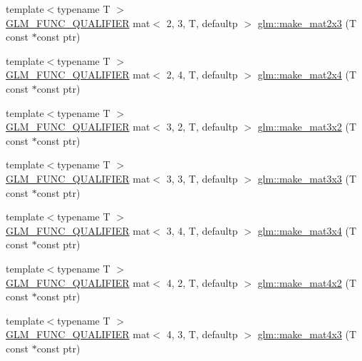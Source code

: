 \begin{DoxyCompactItemize}
\item 
{\footnotesize template$<$typename T $>$ }\\\hyperlink{setup_8hpp_a33fdea6f91c5f834105f7415e2a64407}{G\+L\+M\+\_\+\+F\+U\+N\+C\+\_\+\+Q\+U\+A\+L\+I\+F\+I\+ER} mat$<$ 2, 3, T, defaultp $>$ \hyperlink{group__gtc__type__ptr_ga21982104164789cf8985483aaefc25e8}{glm\+::make\+\_\+mat2x3} (T const $\ast$const ptr)
\item 
{\footnotesize template$<$typename T $>$ }\\\hyperlink{setup_8hpp_a33fdea6f91c5f834105f7415e2a64407}{G\+L\+M\+\_\+\+F\+U\+N\+C\+\_\+\+Q\+U\+A\+L\+I\+F\+I\+ER} mat$<$ 2, 4, T, defaultp $>$ \hyperlink{group__gtc__type__ptr_ga078b862c90b0e9a79ed43a58997d8388}{glm\+::make\+\_\+mat2x4} (T const $\ast$const ptr)
\item 
{\footnotesize template$<$typename T $>$ }\\\hyperlink{setup_8hpp_a33fdea6f91c5f834105f7415e2a64407}{G\+L\+M\+\_\+\+F\+U\+N\+C\+\_\+\+Q\+U\+A\+L\+I\+F\+I\+ER} mat$<$ 3, 2, T, defaultp $>$ \hyperlink{group__gtc__type__ptr_ga27a24e121dc39e6857620e0f85b6e1a8}{glm\+::make\+\_\+mat3x2} (T const $\ast$const ptr)
\item 
{\footnotesize template$<$typename T $>$ }\\\hyperlink{setup_8hpp_a33fdea6f91c5f834105f7415e2a64407}{G\+L\+M\+\_\+\+F\+U\+N\+C\+\_\+\+Q\+U\+A\+L\+I\+F\+I\+ER} mat$<$ 3, 3, T, defaultp $>$ \hyperlink{group__gtc__type__ptr_gaf2e8337b15c3362aaeb6e5849e1c0536}{glm\+::make\+\_\+mat3x3} (T const $\ast$const ptr)
\item 
{\footnotesize template$<$typename T $>$ }\\\hyperlink{setup_8hpp_a33fdea6f91c5f834105f7415e2a64407}{G\+L\+M\+\_\+\+F\+U\+N\+C\+\_\+\+Q\+U\+A\+L\+I\+F\+I\+ER} mat$<$ 3, 4, T, defaultp $>$ \hyperlink{group__gtc__type__ptr_ga05dd66232aedb993e3b8e7b35eaf932b}{glm\+::make\+\_\+mat3x4} (T const $\ast$const ptr)
\item 
{\footnotesize template$<$typename T $>$ }\\\hyperlink{setup_8hpp_a33fdea6f91c5f834105f7415e2a64407}{G\+L\+M\+\_\+\+F\+U\+N\+C\+\_\+\+Q\+U\+A\+L\+I\+F\+I\+ER} mat$<$ 4, 2, T, defaultp $>$ \hyperlink{group__gtc__type__ptr_ga8b34c9b25bf3310d8ff9c828c7e2d97c}{glm\+::make\+\_\+mat4x2} (T const $\ast$const ptr)
\item 
{\footnotesize template$<$typename T $>$ }\\\hyperlink{setup_8hpp_a33fdea6f91c5f834105f7415e2a64407}{G\+L\+M\+\_\+\+F\+U\+N\+C\+\_\+\+Q\+U\+A\+L\+I\+F\+I\+ER} mat$<$ 4, 3, T, defaultp $>$ \hyperlink{group__gtc__type__ptr_ga0330bf6640092d7985fac92927bbd42b}{glm\+::make\+\_\+mat4x3} (T const $\ast$const ptr)

\end{DoxyCompactItemize}
